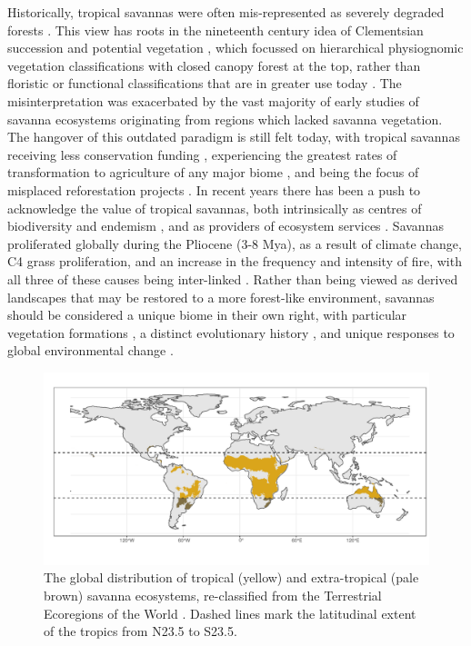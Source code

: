 \begin{refsection}
Historically, tropical savannas were often mis-represented as severely degraded forests \citep{Veldman2016}. This view has roots in the nineteenth century idea of Clementsian succession and potential vegetation \citep{Pulsford2014}, which focussed on hierarchical physiognomic vegetation classifications with closed canopy forest at the top, rather than floristic or functional classifications that are in greater use today \citep{Aleman2020}. The misinterpretation was exacerbated by the vast majority of early studies of savanna ecosystems originating from regions which lacked savanna vegetation. The hangover of this outdated paradigm is still felt today, with tropical savannas receiving less conservation funding \citep{Watson2016}, experiencing the greatest rates of transformation to agriculture of any major biome \citep{Hoekstra2004, Parr2014}, and being the focus of misplaced reforestation projects \citep{Silveira2020, Kumar2020, Laestadius2011}. In recent years there has been a push to acknowledge the value of tropical savannas, both intrinsically as centres of biodiversity and endemism \citep{Kumar2020, Pennington2018}, and as providers of ecosystem services \citep{Ryan2016}. Savannas proliferated globally during the Pliocene (\textapprox{}3-8 Mya), as a result of climate change, C4 grass proliferation, and an increase in the frequency and intensity of fire, with all three of these causes being inter-linked \citep{Cerling1997, Beerling2006, Edwards2010}. Rather than being viewed as derived landscapes that may be restored to a more forest-like environment, savannas should be considered a unique biome in their own right, with particular vegetation formations \citep{Torello2013}, a distinct evolutionary history \citep{Veldman2015}, and unique responses to global environmental change \citep{}.

\begin{figure}[!htb]
\centering
	\includegraphics[width=\textwidth]{img/savanna_map}
	\caption{The global distribution of tropical (yellow) and extra-tropical (pale brown) savanna ecosystems, re-classified from the Terrestrial Ecoregions of the World \citep{Dinerstein2017}. Dashed lines mark the latitudinal extent of the tropics from N23.5\textdegree{} to S23.5\textdegree{}.}
	\label{savanna_map}
\end{figure}


\end{refsection}
